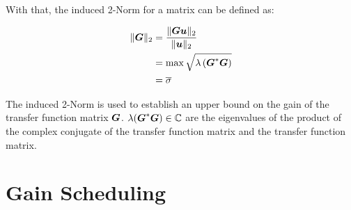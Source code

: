 With that, the induced 2-Norm for a matrix can be defined as:

\begin{align}
\begin{split}
\lVert \mbox{\boldmath$G$} \rVert_2 &= \frac{\lVert \mbox{\boldmath$G$}\mbox{\boldmath$u$}\rVert_2}{\lVert \mbox{\boldmath$u$} \rVert_2} \\
&= \max \sqrt{\lambda\left( \mbox{\boldmath$G$}^* \mbox{\boldmath$G$}\right)} \\
&= \overline{\sigma}
\end{split}
\label{c:control:e:MaxSingularValue}
\end{align}

The induced 2-Norm is used to establish an upper bound on the gain of the transfer function matrix $\mbox{\boldmath$G$}$. $\lambda(\mbox{\boldmath$G$}^* \mbox{\boldmath$G$}) \in \mathbb{C}$ are the eigenvalues of the product of the complex conjugate of the transfer function matrix and the transfer function matrix.

\section{Gain Scheduling} %
\label{c:control:s:gainsched}

